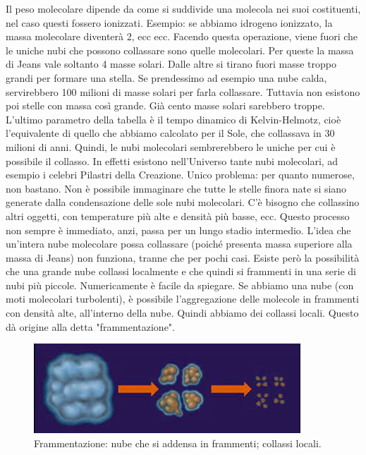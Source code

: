 \documentclass[a4paper,11pt]{article}
\begin{document}
Il peso molecolare dipende da come si suddivide una molecola nei suoi costituenti, nel caso questi fossero ionizzati. Esempio: se abbiamo idrogeno ionizzato, la massa molecolare diventerà 2, ecc ecc. Facendo questa operazione, viene fuori che le uniche nubi che possono collassare sono quelle molecolari. Per queste la massa di Jeans vale soltanto 4 masse solari. Dalle altre si tirano fuori masse troppo grandi per formare una stella. Se prendessimo ad esempio una nube calda, servirebbero 100 milioni di masse solari per farla collassare. Tuttavia non esistono poi stelle con massa così grande. Già cento masse solari sarebbero troppe. L'ultimo parametro della tabella è il tempo dinamico di Kelvin-Helmotz, cioè l'equivalente di quello che abbiamo calcolato per il Sole, che collassava in 30 milioni di anni. Quindi, le nubi molecolari sembrerebbero le uniche per cui è possibile il collasso. In effetti esistono nell'Universo tante nubi molecolari, ad esempio i celebri Pilastri della Creazione. Unico problema: per quanto numerose, non bastano. Non è possibile immaginare che tutte le stelle finora nate si siano generate dalla condensazione delle sole nubi molecolari. C'è bisogno che collassino altri oggetti, con temperature più alte e densità più basse, ecc. Questo processo non sempre è immediato, anzi, passa per un lungo stadio intermedio. L'idea che un'intera nube molecolare possa collassare (poiché presenta massa superiore alla massa di Jeans) non funziona, tranne che per pochi casi. Esiste però la possibilità che una grande nube collassi localmente e che quindi si frammenti in una serie di nubi più piccole. Numericamente è facile da spiegare. Se abbiamo una nube (con moti molecolari turbolenti), è possibile l'aggregazione delle molecole in frammenti con densità alte, all'interno della nube. Quindi abbiamo dei collassi locali. Questo dà origine alla detta "frammentazione". 
\begin{figure}[h!!]
        \centering
        \includegraphics[width=10cm]{lezione 28 novembre/frammentazione.png}
        \caption{Frammentazione: nube che si addensa in frammenti; collassi locali.}
        \label{lezione 28 novembre/frammentazione.png}
    \end{figure} 
\end{document}
